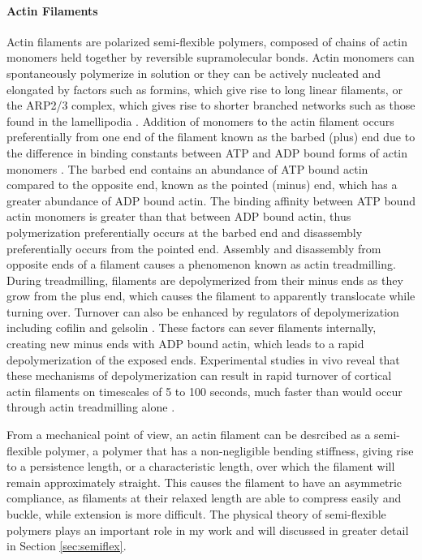 \paragraph{Actin Filaments} Actin filaments are polarized semi-flexible polymers, composed of chains of actin monomers held together by reversible supramolecular bonds.  Actin monomers can spontaneously polymerize in solution or they can be actively nucleated and elongated by factors such as formins, which give rise to long linear filaments, or the ARP2/3 complex, which gives rise to shorter branched networks such as those found in the lamellipodia \cite{phys_bio_cell}.  Addition of monomers to the actin filament occurs preferentially from one end of the filament known as the barbed (plus) end due to the difference in binding constants between ATP and ADP bound forms of actin monomers \cite{doi:10.1146/annurev-biophys-051309-103849}. The barbed end contains an abundance of ATP bound actin compared to the opposite end, known as the pointed (minus) end, which has a greater abundance of ADP bound actin. The binding affinity between ATP bound actin monomers is greater than that between ADP bound actin, thus polymerization preferentially occurs at the barbed end and disassembly preferentially occurs from the pointed end.  Assembly and disassembly from opposite ends of a filament causes a phenomenon known as actin treadmilling. During treadmilling, filaments are depolymerized from their minus ends as they grow from the plus end, which causes the filament to apparently translocate while turning over\cite{doi:10.1146/annurev-biophys-051309-103849}.  Turnover can also be enhanced by regulators of depolymerization including cofilin and gelsolin \cite{bemenet}. These  factors can  sever filaments internally, creating new minus ends with ADP bound actin, which leads to a rapid depolymerization of the exposed ends.  Experimental studies in vivo  reveal that these mechanisms of depolymerization can result in rapid turnover of cortical actin filaments on timescales of 5 to 100 seconds, much faster than would occur through actin treadmilling alone \cite{Robin:2014aa, Fritzsche:2013aa, Fritzschee1501337, Carlsson:2010aa, Lai:2008aa}.   

From a mechanical point of view, an  actin filament can be desrcibed as  a semi-flexible polymer,  a polymer that has a non-negligible bending stiffness, giving rise to a persistence length, or a characteristic length, over which the filament will remain approximately straight.  This causes the filament to have an asymmetric compliance, as filaments at their relaxed length are able to compress easily and buckle, while extension is more difficult.  The physical theory of semi-flexible polymers plays an important role in my work and will discussed in greater detail in Section \ref{sec:semiflex}.

